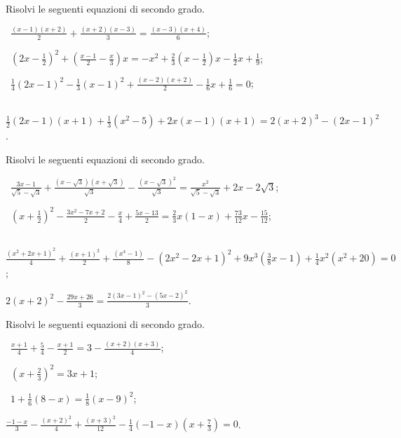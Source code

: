  \begin{esercizio}[\Ast]
\label{ese:3.27}
Risolvi le seguenti equazioni di secondo grado.
 \begin{enumeratea}
 \item~$\frac{(x-1) (x + 2)}{2} + \frac{(x + 2) (x-3)}{3} =\frac{(x-3) (x + 4)}{6}$;
 \item~$\left(2 x-\frac{1}{2} \right)^{2} + \left(\frac{x-1}{2} -\frac{x}{3} \right) x =-x^{2} + \frac{2}{3} \left(x-\frac{1}{2}\right) x-\frac{1}{2} x + \frac{1}{9}$;
 \item~$\frac{1}{4} (2 x-1)^{2}-\frac{1}{3} (x-1)^{2} +\frac{(x-2) (x + 2)}{2}-\frac{1}{6} x + \frac{1}{6} = 0$;
 \item~$\frac{1}{2} (2 x-1) (x + 1) + \frac{1}{3} \left(x^{2}-5\right) + 2 x (x-1) (x + 1) = 2 (x + 2)^{3}-(2 x-1)^{2}$.
 \end{enumeratea}
\end{esercizio}

\begin{esercizio}[\Ast]
\label{ese:3.28}
Risolvi le seguenti equazioni di secondo grado.
 \begin{enumeratea}
 \item~$\frac{3 x-1}{\sqrt{5}-\sqrt{3}} + \frac{\left(x-\sqrt{3}\right) \left(x + \sqrt{3} \right)}{\sqrt{3}}-\frac{\left(x -\sqrt{3} \right)^{2}}{\sqrt{3}} = \frac{x^{2}}{\sqrt{5}-\sqrt{3}} + 2 x-2 \sqrt{3}$;
 \item~$\left(x + \frac{1}{2} \right)^{2}-\frac{3 x^{2}-7 x + 2}{2} - \frac{x}{4} + \frac{5 x-13}{2} = \frac{2}{3} x (1-x) +\frac{73}{12} x-\frac{15}{12}$;
 \item~$\frac{(x^{2} + 2 x + 1)^{2}}{4} + \frac{(x + 1)^{2}}{2}+ \frac{(x^{4}-1)}{8}-(2 x^{2}-2 x + 1)^{2} + 9 x^{3}\left(\frac{3}{8} x-1 \right) + \frac{1}{4} x^{2} (x^{2} + 20)= 0$;
  \item $2(x+2)^{2}-\frac{29x+26}{3}=\frac{2(3x-1)^{2}-(5x-2)^{2}}{3}$.
 \end{enumeratea}
\end{esercizio}

\begin{esercizio}[\Ast]
\label{ese:3.29} %
Risolvi le seguenti equazioni di secondo grado.
 \begin{enumeratea}
 \item~$\frac{x+1}{4} + \frac{5}{4}-\frac{x+1}{2} = 3-\frac{(x+2)(x+3)}{4}$;
 \item~$\left(x + \frac{2}{3} \right)^{2}= 3x+1$;
 \item~$1+\frac{1}{6}(8-x)=\frac{1}{8}(x-9)^{2}$;
 \item $\frac{-1-x}{3}-\frac{(x+2)^{2}}{4}+\frac{(x+3)^{2}}{12}-\frac{1}{4}(-1-x)\left(x+\frac{7}{3}\right)=0$.
 \end{enumeratea}
\end{esercizio}

